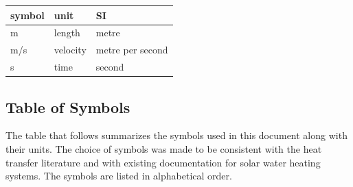 \documentclass[12pt]{article}
\begin{document}
\renewcommand{\arraystretch}{1.2}
  \noindent \begin{tabular}{l l l} 
    \toprule		
    \textbf{symbol} & \textbf{unit} & \textbf{SI}\\
    \midrule 
    \si{\metre} & length & metre\\
    \si[per-mode=symbol]{\metre\per\second} & velocity	& metre per second\\
    \si{\second} & time & second\\
    \bottomrule
  \end{tabular}




\subsection{Table of Symbols}

The table that follows summarizes the symbols used in this document along with
their units.  The choice of symbols was made to be consistent with the heat
transfer literature and with existing documentation for solar water heating
systems.  The symbols are listed in alphabetical order.
\end{document}
